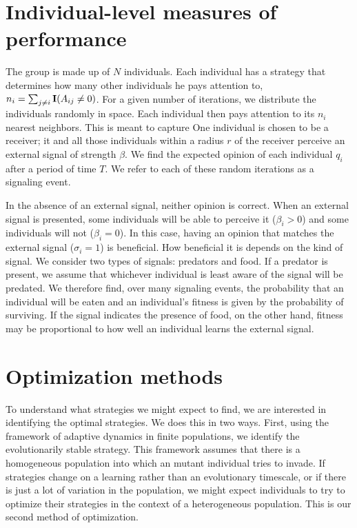 \documentclass{article}
\begin{document}
\section{Individual-level measures of performance}
The group is made up of $N$ individuals.  Each individual has a strategy that determines how many other individuals he pays attention to, $n_i=\sum_{j\neq i}{\bf I}(A_{ij}\neq 0)$.  For a given number of iterations, we distribute the individuals randomly in space.  Each individual then pays attention to its $n_i$ nearest neighbors.  This is meant to capture One individual is chosen to be a receiver; it and all those individuals within a radius $r$ of the receiver perceive an external signal of strength $\beta$.  We find the expected opinion of each individual $q_i$ after a period of time $T$.  We refer to each of these random iterations as a signaling event.

In the absence of an external signal, neither opinion is correct.  When an external signal is presented, some individuals will be able to perceive it ($\beta_i>0$) and some individuals will not ($\beta_i=0$).  In this case, having an opinion that matches the external signal ($\sigma_i=1$) is beneficial.  How beneficial it is depends on the kind of signal.  We consider two types of signals: predators and food.  If a predator is present, we assume that whichever individual is least aware of the signal will be predated.  We therefore find, over many signaling events, the probability that an individual will be eaten and an individual's fitness is given by the probability of surviving.  If the signal indicates the presence of food, on the other hand, fitness may be proportional to how well an individual learns the external signal.  


\section{Optimization methods}
To understand what strategies we might expect to find, we are interested in identifying the optimal strategies.  We does this in two ways.  First, using the framework of adaptive dynamics in finite populations, we identify the evolutionarily stable strategy.  This framework assumes that there is a homogeneous population into which an mutant individual tries to invade.  If strategies change on a learning rather than an evolutionary timescale, or if there is just a lot of variation in the population, we might expect individuals to try to optimize their strategies in the context of a heterogeneous population.  This is our second method of optimization.
\end{document}
